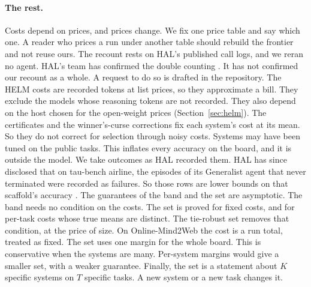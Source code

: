\documentclass[11pt]{article}
\begin{document}
\paragraph{The rest.}
Costs depend on prices, and prices change. We fix one price table and say which one. A reader who prices a run under another table should rebuild the frontier and not reuse ours. The recount rests on HAL's published call logs, and we reran no agent. HAL's team has confirmed the double counting \citep{liu2026halissues}. It has not confirmed our recount as a whole. A request to do so is drafted in the repository. The HELM costs are recorded tokens at list prices, so they approximate a bill. They exclude the models whose reasoning tokens are not recorded. They also depend on the host chosen for the open-weight prices (Section~\ref{sec:helm}). The certificates and the winner's-curse corrections fix each system's cost at its mean. So they do not correct for selection through noisy costs. Systems may have been tuned on the public tasks. This inflates every accuracy on the board, and it is outside the model. We take outcomes as HAL recorded them. HAL has since disclosed that on tau-bench airline, the episodes of its Generalist agent that never terminated were recorded as failures. So those rows are lower bounds on that scaffold's accuracy \citep{liu2026halissues}. The guarantees of the band and the set are asymptotic. The band needs no condition on the costs. The set is proved for fixed costs, and for per-task costs whose true means are distinct. The tie-robust set removes that condition, at the price of size. On Online-Mind2Web the cost is a run total, treated as fixed. The set uses one margin for the whole board. This is conservative when the systems are many. Per-system margins would give a smaller set, with a weaker guarantee. Finally, the set is a statement about $K$ specific systems on $T$ specific tasks. A new system or a new task changes it.
\end{document}
